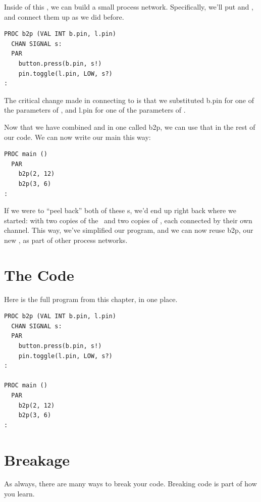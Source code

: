 \newpage

Inside of this \PROC, we can build a small process network. Specifically, we'll put \bp and \tp, and connect them up as we did before.

\vspace{3mm}
\begin{lstlisting}
PROC b2p (VAL INT b.pin, l.pin)
  CHAN SIGNAL s:
  PAR
    button.press(b.pin, s!)
    pin.toggle(l.pin, LOW, s?)
:
\end{lstlisting}

The critical change made in connecting \bp to \tp  is that we substituted {\code b.pin} for one of the parameters of \bp, and {\code l.pin} for one of the parameters of \tp. 

Now that we have combined \bp and \tp in one \PROC called {\code b2p}, we can use that in the rest of our code. We can now write our {\code main} \PROC this way:

\vspace{3mm}
\begin{lstlisting}
PROC main ()
  PAR
    b2p(2, 12)
    b2p(3, 6)
:
\end{lstlisting}

If we were to ``peel back'' both of these {\PROCedure}s, we'd end up right back where we started: with two copies of the \bp ~\PROC and two copies of \tp, each connected by their own channel. This way, we've simplified our program, and we can now reuse {\code b2p}, our new \PROC, as part of other process networks.

\newpage

\section{The Code}

Here is the full program from this chapter, in one place.

\vspace{3mm}
\begin{lstlisting}
PROC b2p (VAL INT b.pin, l.pin)
  CHAN SIGNAL s:
  PAR
    button.press(b.pin, s!)
    pin.toggle(l.pin, LOW, s?)
:

PROC main ()
  PAR
    b2p(2, 12)
    b2p(3, 6)
:
\end{lstlisting}

\section{Breakage}
As always, there are many ways to break your code. Breaking code is part of how you learn.

